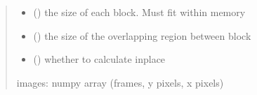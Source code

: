 \documentclass[letterpaper,10pt,english]{sphinxmanual}
\begin{document}
\begin{fulllineitems}
\begin{quote}
\begin{description}
\begin{itemize}
\item {} 
\sphinxAtStartPar
{} () \textendash{} the size of each block. Must fit within memory

\item {} 
\sphinxAtStartPar
{} () \textendash{} the size of the overlapping region between block

\item {} 
\sphinxAtStartPar
{} () \textendash{} whether to calculate in\sphinxhyphen{}place

\end{itemize}

\sphinxAtStartPar
images: numpy array (frames, y pixels, x pixels)

\sphinxAtStartPar
{}

\end{description}\end{quote}

\end{fulllineitems}

\end{document}
